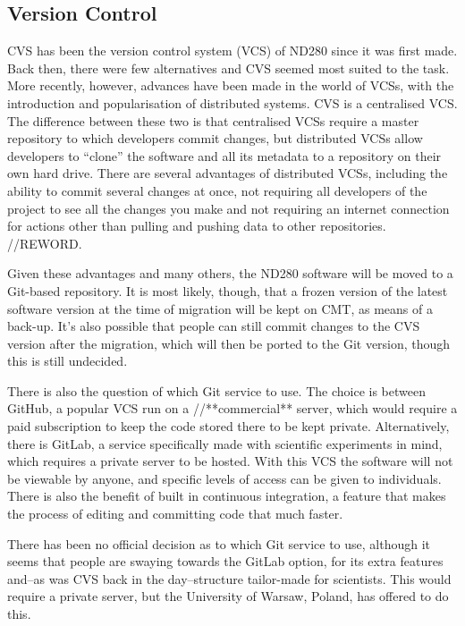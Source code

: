\documentclass[aps,pra,12pt,notitlepage,tightenlines]{revtex4-1}
\begin{document}
\subsection{Version Control}
CVS has been the version control system (VCS) of ND280 since it was first made. Back then, there were few alternatives and CVS seemed most suited to the task. More recently, however, advances have been made in the world of VCSs, with the introduction and popularisation of distributed systems. CVS is a centralised VCS. The difference between these two is that centralised VCSs require a master repository to which developers commit changes, but distributed VCSs allow developers to ``clone'' the software and all its metadata to a repository on their own hard drive. There are several advantages of distributed VCSs, including the ability to commit several changes at once, not requiring all developers of the project to see all the changes you make and not requiring an internet connection for actions other than pulling and pushing data to other repositories. //REWORD.

Given these advantages and many others, the ND280 software will be moved to a Git-based repository. It is most likely, though, that a frozen version of the latest software version at the time of migration will be kept on CMT, as means of a back-up. It's also possible that people can still commit changes to the CVS version after the migration, which will then be ported to the Git version, though this is still undecided.

There is also the question of which Git service to use. The choice is between GitHub, a popular VCS run on a //**commercial** server, which would require a paid subscription to keep the code stored there to be kept private. Alternatively, there is GitLab, a service specifically made with scientific experiments in mind, which requires a private server to be hosted. With this VCS the software will not be viewable by anyone, and specific levels of access can be given to individuals. There is also the benefit of built in continuous integration, a feature that makes the process of editing and committing code that much faster.

There has been no official decision as to which Git service to use, although it seems that people are swaying towards the GitLab option, for its extra features and--as was CVS back in the day--structure tailor-made for scientists. This would require a private server, but the University of Warsaw, Poland, has offered to do this.
\end{document}
